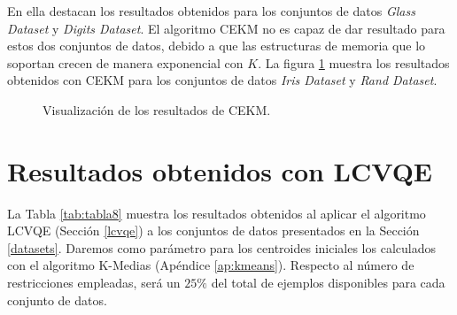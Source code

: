 En ella destacan los resultados obtenidos para los conjuntos de datos \textit{Glass Dataset} y \textit{Digits Dataset}. El algoritmo \acs{CEKM} no es capaz de dar resultado para estos dos conjuntos de datos, debido a que las estructuras de memoria que lo soportan crecen de manera exponencial con $K$. La figura \ref{fig:figure25} muestra los resultados obtenidos con \acs{CEKM} para los conjuntos de datos \textit{Iris Dataset} y \textit{Rand Dataset}.

\begin{figure}[bth]
	\myfloatalign
	\caption{Visualización de los resultados de \acs{CEKM}.}\label{fig:figure25}
\end{figure}

\clearpage

\section{Resultados obtenidos con LCVQE}

La Tabla \ref{tab:tabla8} muestra los resultados obtenidos al aplicar el algoritmo \acf{LCVQE} (Sección \ref{lcvqe}) a los conjuntos de datos presentados en la Sección \ref{datasets}. Daremos como parámetro para los centroides iniciales los calculados con el algoritmo K-Medias (Apéndice \ref{ap:kmeans}). Respecto al número de restricciones empleadas, será un $25\%$ del total de ejemplos disponibles para cada conjunto de datos.

